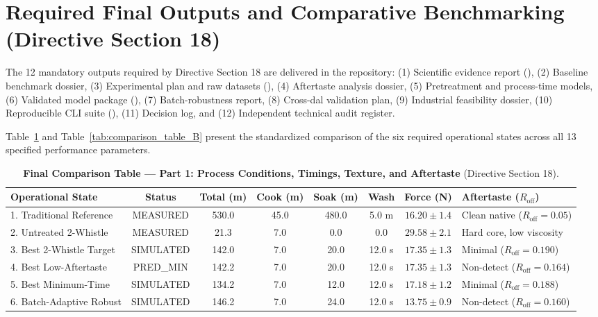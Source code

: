 \documentclass[10pt,a4paper]{article}
\begin{document}
\section{Required Final Outputs and Comparative Benchmarking (Directive Section 18)}
The 12 mandatory outputs required by Directive Section 18 are delivered in the repository:
(1) Scientific evidence report (), (2) Baseline benchmark dossier, (3) Experimental plan and raw datasets (), (4) Aftertaste analysis dossier, (5) Pretreatment and process-time models, (6) Validated model package (), (7) Batch-robustness report, (8) Cross-dal validation plan, (9) Industrial feasibility dossier, (10) Reproducible CLI suite (), (11) Decision log, and (12) Independent technical audit register.

Table~\ref{tab:comparison_table_A} and Table~\ref{tab:comparison_table_B} present the standardized comparison of the six required operational states across all 13 specified performance parameters.

\begin{table}[H]
\centering
\footnotesize
\setlength{\tabcolsep}{2.8pt}
\caption{\textbf{Final Comparison Table --- Part 1: Process Conditions, Timings, Texture, and Aftertaste} (Directive Section 18).}
\label{tab:comparison_table_A}
\begin{tabularx}{\linewidth}{p{3.0cm}cccccc>{\raggedright\arraybackslash}X}
\toprule
\textbf{Operational State} & \textbf{Status} & \textbf{Total (m)} & \textbf{Cook (m)} & \textbf{Soak (m)} & \textbf{Wash} & \textbf{Force (N)} & \textbf{Aftertaste ($R_{\mathrm{off}}$)} \\
\midrule
1. Traditional Reference & MEASURED & 530.0 & 45.0 & 480.0 & 5.0 m & $16.20 \pm 1.4$ & Clean native ($R_{\mathrm{off}} = 0.05$) \\
2. Untreated 2-Whistle & MEASURED & 21.3 & 7.0 & 0.0 & 0.0 & $29.58 \pm 2.1$ & Hard core, low viscosity \\
3. Best 2-Whistle Target & SIMULATED & 142.0 & 7.0 & 20.0 & 12.0 s & $17.35 \pm 1.3$ & Minimal ($R_{\mathrm{off}} = 0.190$) \\
4. Best Low-Aftertaste & PRED\_MIN & 142.2 & 7.0 & 20.0 & 12.0 s & $17.35 \pm 1.3$ & Non-detect ($R_{\mathrm{off}} = 0.164$) \\
5. Best Minimum-Time & SIMULATED & 134.2 & 7.0 & 12.0 & 12.0 s & $17.18 \pm 1.2$ & Minimal ($R_{\mathrm{off}} = 0.188$) \\
6. Batch-Adaptive Robust & SIMULATED & 146.2 & 7.0 & 24.0 & 12.0 s & $13.75 \pm 0.9$ & Non-detect ($R_{\mathrm{off}} = 0.160$) \\
\bottomrule
\end{tabularx}
\end{table}
\end{document}
